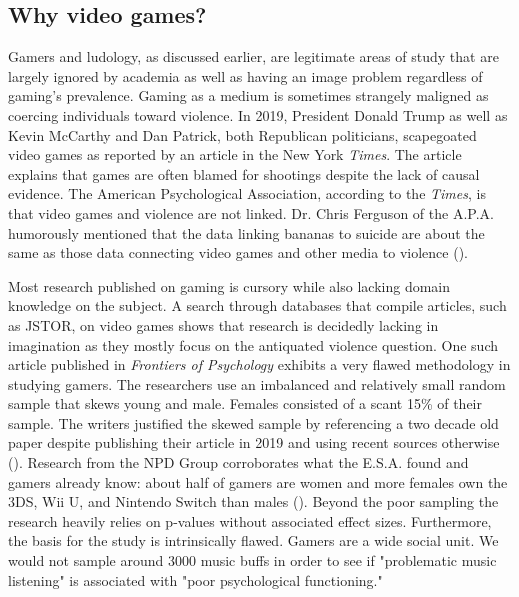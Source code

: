 \documentclass[12pt, a4paper]{article}
\begin{document}
\subsection{Why video games?}
Gamers and ludology, as discussed earlier, are legitimate areas of study that are largely ignored by academia as well as having an image problem regardless of gaming's prevalence. Gaming as a medium is sometimes strangely maligned as coercing individuals toward violence. In 2019, President Donald Trump as well as Kevin McCarthy and Dan Patrick, both Republican politicians, scapegoated video games as reported by an article in the New York \textit{Times}. The article explains that games are often blamed for shootings despite the lack of causal evidence. The American Psychological Association, according to the \textit{Times}, is that video games and violence are not linked. Dr. Chris Ferguson of the A.P.A. humorously mentioned that the data linking bananas to suicide are about the same as those data connecting video games and other media to violence (\cite{drapernyt0819}).

Most research published on gaming is cursory while also lacking domain knowledge on the subject. A search through databases that compile articles, such as JSTOR, on video games shows that research is decidedly lacking in imagination as they mostly focus on the antiquated violence question. One such article published in \textit{Frontiers of Psychology} exhibits a very flawed methodology in studying gamers. The researchers use an imbalanced and relatively small random sample that skews young and male. Females consisted of a scant 15\% of their sample. The writers justified the skewed sample by referencing a two decade old paper despite publishing their article in 2019 and using recent sources otherwise (\cite{badresearch}). Research from the NPD Group corroborates what the E.S.A. found and gamers already know: about half of gamers are women and more females own the 3DS, Wii U, and Nintendo Switch than males (\cite{npdgamers}). Beyond the poor sampling the research heavily relies on p-values without associated effect sizes. Furthermore, the basis for the study is intrinsically flawed. Gamers are a wide social unit. We would not sample around 3000 music buffs in order to see if "problematic music listening" is associated with "poor psychological functioning."
\end{document}
